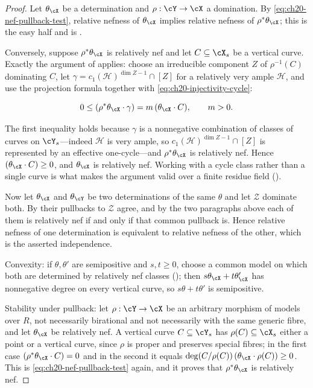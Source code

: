 \begin{proof}
Let $\theta_{\cX}$ be a determination and $\rho:\cY\to\cX$ a
domination.  By \eqref{eq:ch20-nef-pullback-test}, relative nefness of
$\theta_{\cX}$ implies relative nefness of $\rho^*\theta_{\cX}$; this is
the easy half and is .

Conversely, suppose $\rho^*\theta_{\cX}$ is relatively nef and let
$C\subseteq\cX_s$ be a vertical curve.  Exactly the argument of
 applies: choose an irreducible component
$Z$ of $\rho^{-1}(C)$ dominating $C$, let
$\gamma=c_1(\mathcal H)^{\dim Z-1}\cap[Z]$ for a relatively very ample
$\mathcal H$, and use the projection formula together with
\eqref{eq:ch20-injectivity-cycle}:

\[
 0\leq(\rho^*\theta_{\cX}\cdot\gamma)=m\,(\theta_{\cX}\cdot C),
 \qquad m>0 .
\]

The first inequality holds because $\gamma$ is a nonnegative combination of
classes of curves on $\cY_s$---indeed $\mathcal H$ is very ample, so
$c_1(\mathcal H)^{\dim Z-1}\cap[Z]$ is represented by an effective
one-cycle---and $\rho^*\theta_{\cX}$ is relatively nef.  Hence
$(\theta_{\cX}\cdot C)\geq0$, and $\theta_{\cX}$ is relatively nef.
Working with a cycle class rather than a single curve is what makes the
argument valid over a finite residue field
().

Now let $\theta_{\cX}$ and $\theta_{\cY}$ be two determinations of the
same $\theta$ and let $\mathcal Z$ dominate both.  By
 their pullbacks to $\mathcal Z$ agree, and
by the two paragraphs above each of them is relatively nef if and only if
that common pullback is.  Hence relative nefness of one determination is
equivalent to relative nefness of the other, which is the asserted
independence.

Convexity: if $\theta,\theta'$ are semipositive and $s,t\geq0$, choose a
common model on which both are determined by relatively nef classes
(); then
$s\theta_{\cX}+t\theta'_{\cX}$ has nonnegative degree on every vertical
curve, so $s\theta+t\theta'$ is semipositive.

Stability under pullback: let $\rho:\cY\to\cX$ be an arbitrary morphism of
models over $R$, not necessarily birational and not necessarily with the
same generic fibre, and let $\theta_{\cX}$ be relatively nef.  A vertical
curve $C\subseteq\cY_s$ has $\rho(C)\subseteq\cX_s$ either a point or a
vertical curve, since $\rho$ is proper and preserves special fibres; in
the first case $(\rho^*\theta_{\cX}\cdot C)=0$ and in the second it equals
$\deg(C/\rho(C))\,(\theta_{\cX}\cdot\rho(C))\geq0$.  This is
\eqref{eq:ch20-nef-pullback-test} again, and it proves that
$\rho^*\theta_{\cX}$ is relatively nef.
\end{proof}

